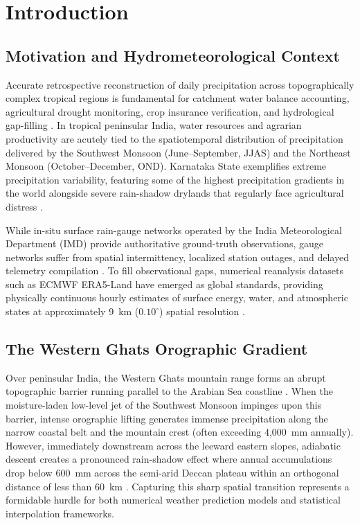 \documentclass[12pt]{article}
\begin{document}
\newpage
{}
\setcounter{page}{1}
\tableofcontents
\newpage
\listoffigures
\newpage
\listoftables
\newpage

\section{Introduction}
\setcounter{page}{1}

\subsection{Motivation and Hydrometeorological Context}
Accurate retrospective reconstruction of daily precipitation across topographically complex tropical regions is fundamental for catchment water balance accounting, agricultural drought monitoring, crop insurance verification, and hydrological gap-filling \cite{masson2021}. In tropical peninsular India, water resources and agrarian productivity are acutely tied to the spatiotemporal distribution of precipitation delivered by the Southwest Monsoon (June--September, JJAS) and the Northeast Monsoon (October--December, OND). Karnataka State exemplifies extreme precipitation variability, featuring some of the highest precipitation gradients in the world alongside severe rain-shadow drylands that regularly face agricultural distress \cite{pai2014}.

While in-situ surface rain-gauge networks operated by the India Meteorological Department (IMD) provide authoritative ground-truth observations, gauge networks suffer from spatial intermittency, localized station outages, and delayed telemetry compilation \cite{rajeevan2006}. To fill observational gaps, numerical reanalysis datasets such as ECMWF ERA5-Land have emerged as global standards, providing physically continuous hourly estimates of surface energy, water, and atmospheric states at approximately 9~km ($0.10^\circ$) spatial resolution \cite{munoz2021, hersbach2020}.

\subsection{The Western Ghats Orographic Gradient}
Over peninsular India, the Western Ghats mountain range forms an abrupt topographic barrier running parallel to the Arabian Sea coastline \cite{houze2003}. When the moisture-laden low-level jet of the Southwest Monsoon impinges upon this barrier, intense orographic lifting generates immense precipitation along the narrow coastal belt and the mountain crest (often exceeding 4,000~mm annually). However, immediately downstream across the leeward eastern slopes, adiabatic descent creates a pronounced rain-shadow effect where annual accumulations drop below 600~mm across the semi-arid Deccan plateau within an orthogonal distance of less than 60~km \cite{mohanty2005}. Capturing this sharp spatial transition represents a formidable hurdle for both numerical weather prediction models and statistical interpolation frameworks.
\end{document}
